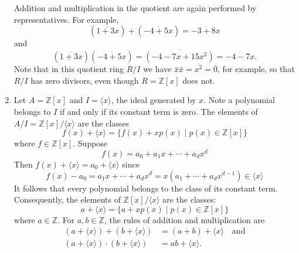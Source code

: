 \documentclass[11pt,a4paper]{article}
\begin{document}
\begin{exa}
\begin{enumerate}[label=(\roman*)]
Addition and multiplication in the quotient are again performed by representatives.
For example,
\[
(\overline{1+3 x})+(\overline{-4+5 x})=\overline{-3+8 x}
\]
and
\[
(\overline{1+3 x})(\overline{-4+5 x})=\overline{\left(-4-7 x+15 x^2\right)}=\overline{-4-7 x} .
\]
Note that in this quotient ring $R / I$ we have $\bar{x} \bar{x}=\overline{x^2}=\overline{0}$, for example, so that $R / I$ has zero divisors, even though $R=\mathbb{Z}[x]$ does not. 

\item Let \( A = \mathbb{Z}[x] \) and \( I = \langle x \rangle \), the ideal generated by \( x \). Note a polynomial belongs to \( I \) if and only if its constant term is zero. The elements of \( A / I = \mathbb{Z}[x] / \langle x \rangle \) are the classes
\[
f(x) + \langle x \rangle = \{f(x) + xp(x) \mid p(x) \in \mathbb{Z}[x]\}
\]
where \( f \in \mathbb{Z}[x] \). Suppose
\[
f(x) = a_0 + a_1x + \cdots + a_d x^d
\]
Then \( f(x) + \langle x \rangle = a_0 + \langle x \rangle \) since
\[
f(x) - a_0 = a_1x + \cdots + a_d x^d = x\left(a_1 + \cdots + a_d x^{d-1}\right) \in \langle x \rangle
\]
It follows that every polynomial belongs to the class of its constant term. Consequently, the elements of \( \mathbb{Z}[x] / \langle x \rangle \) are the classes:
\[
a + \langle x \rangle = \{a + xp(x) \mid p(x) \in \mathbb{Z}[x]\}
\]
where \( a \in \mathbb{Z} \). For \( a, b \in \mathbb{Z} \), the rules of addition and multiplication are
\begin{align*}
(a + \langle x \rangle) + (b + \langle x \rangle) &= (a + b) + \langle x \rangle\quad\text{and}\\
(a + \langle x \rangle) \cdot (b + \langle x \rangle) &= ab + \langle x \rangle.
\end{align*}


\end{enumerate}
\end{exa}
\end{document}
